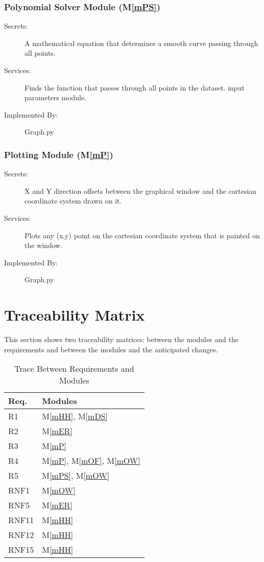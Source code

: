 \documentclass[12pt, titlepage]{article}
\newcommand{\mref}[1]{M\ref{#1}}
\begin{document}
\subsubsection{Polynomial Solver Module (\mref{mPS})}
\begin{description}
\item[Secrets:]A mathematical equation that determines a smooth curve passing through all points.
\item[Services:]Finds the function that passes through all points in the dataset. 
  input parameters module.
\item[Implemented By:] Graph.py
\end{description}

\subsubsection{Plotting Module (\mref{mP})}
\begin{description}
\item[Secrets:] X and Y direction offsets between the graphical window and the cartesian coordinate system drawn on it.
\item[Services:]Plots any (x,y) point on the cartesian coordinate system that is painted on the window. 
\item[Implemented By:] Graph.py
\end{description}

\section{Traceability Matrix} \label{SecTM}%

This section shows two traceability matrices: between the modules and the
requirements and between the modules and the anticipated changes.

\begin{table}[H]
\centering
\begin{tabular}{p{} p{}}
\toprule
\textbf{Req.} & \textbf{Modules}\\
\midrule
R1 & \mref{mHH}, \mref{mDS} \\
R2 & \mref{mER} \\
R3 & \mref{mP}\\
R4 & \mref{mP}, \mref{mOF}, \mref{mOW}\\
R5 & \mref{mPS}, \mref{mOW} \\
RNF1 & \mref{mOW} \\
RNF5 & \mref{mER} \\
RNF11 & \mref{mHH}\\
RNF12 & \mref{mHH}\\
RNF15 & \mref{mHH}\\
\bottomrule
\end{tabular}
\caption{Trace Between Requirements and Modules}
\label{TblRT}
\end{table}
\end{document}
